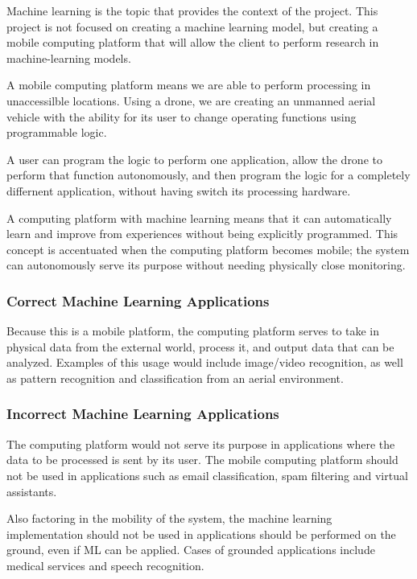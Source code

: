 
% 


Machine learning is the topic that provides the context of the project. This project is not focused on creating a machine learning model, but creating a mobile computing platform that will allow the client to perform research in machine-learning models.

A mobile computing platform means we are able to perform processing in unaccessilble locations. Using a drone, we are creating an unmanned aerial vehicle with the ability for its user to change operating functions using programmable logic.

A user can program the logic to perform one application, allow the drone to perform that function autonomously, and then program the logic for a completely differnent application, without having switch its processing hardware.

A computing platform with machine learning means that it can automatically learn and improve from experiences without being explicitly programmed. This concept is accentuated when the computing platform becomes mobile; the system can autonomously serve its purpose without needing physically close monitoring.

\subsubsection{Correct Machine Learning Applications}
Because this is a mobile platform, the computing platform serves to take in physical data from the external world, process it, and output data that can be analyzed. Examples of this usage would include image/video recognition, as well as pattern recognition and classification from an aerial environment.

\subsubsection{Incorrect Machine Learning Applications}
The computing platform would not serve its purpose in applications where the data to be processed is sent by its user. The mobile computing platform should not be used in applications such as email classification, spam filtering and virtual assistants.

Also factoring in the mobility of the system, the machine learning implementation should not be used in applications should be performed on the ground, even if ML can be applied. Cases of grounded applications include medical services and speech recognition.

